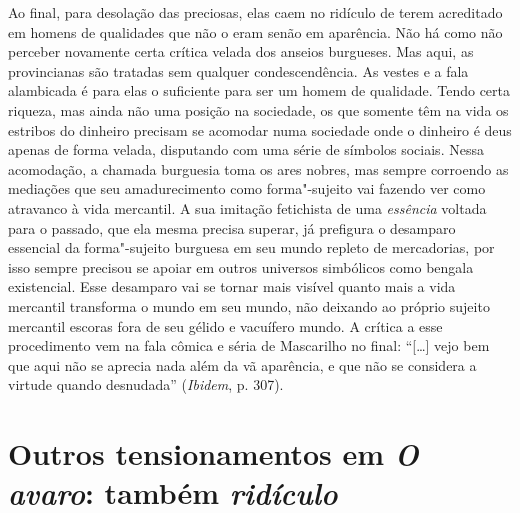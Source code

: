 Ao final, para desolação das preciosas, elas caem no ridículo de terem
acreditado em homens de qualidades que não o eram senão em aparência.
Não há como não perceber novamente certa crítica velada dos anseios
burgueses. Mas aqui, as provincianas são tratadas sem qualquer
condescendência. As vestes e a fala alambicada é para elas o suficiente
para ser um homem de qualidade. Tendo certa riqueza, mas ainda não uma
posição na sociedade, os que somente têm na vida os estribos do dinheiro
precisam se acomodar numa sociedade onde o dinheiro é deus apenas de
forma velada, disputando com uma série de símbolos sociais. Nessa
acomodação, a chamada burguesia toma os ares nobres, mas sempre
corroendo as mediações que seu amadurecimento como forma"-sujeito vai
fazendo ver como atravanco à vida mercantil. A sua imitação fetichista
de uma \emph{essência} voltada para o passado, que ela mesma precisa
superar, já prefigura o desamparo essencial da forma"-sujeito burguesa em
seu mundo repleto de mercadorias, por isso sempre precisou se apoiar em
outros universos simbólicos como bengala existencial. Esse desamparo vai
se tornar mais visível quanto mais a vida mercantil transforma o mundo
em seu mundo, não deixando ao próprio sujeito mercantil escoras fora de
seu gélido e vacuífero mundo. A crítica a esse procedimento vem na fala cômica e séria de
Mascarilho no final: ``[\ldots{}] vejo bem que aqui não se aprecia nada
além da vã aparência, e que não se considera a virtude quando
desnudada'' (\emph{Ibidem}, p. 307).

\section*{Outros tensionamentos em \emph{O avaro}: também \emph{ridículo}}


